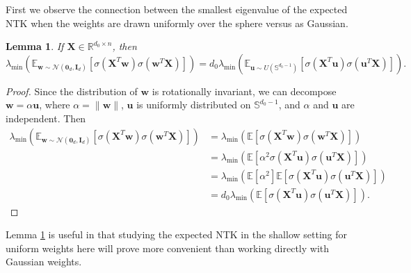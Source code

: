 \documentclass{article}
\newtheorem{lemma}[theorem]{Lemma}
\theoremstyle{definition}
\newcommand*{\R}{\mathbb{R}}
\newcommand{\E}{\mathbb{E}}
\newcommand{\mc}{\mathcal}
\renewcommand{\S}{\mathbb{S}}
\def\vu{{\bm{u}}}
\def\vw{{\bm{w}}}
\def\mI{{\bm{I}}}
\def\mX{{\bm{X}}}
\begin{document}
First we observe the connection between the smallest eigenvalue of the expected NTK when the weights are drawn uniformly over the sphere versus as Gaussian.
\begin{lemma}\label{lem:spherical-gaussian-equivalence}
    If $\mX \in \R^{d_0 \times n}$, then
    \[\lambda_{\min}\left(\E_{\vw \sim \mc{N}(\bm{0}_d, \mI_d) }\left[ \sigma\left( \mX^T \vw \right) \sigma\left(\vw^T \mX\right) \right] \right) = d_0\lambda_{\min}\left(\E_{\vu \sim U(\S^{d_0 - 1}) }\left[\sigma\left( \mX^T \vu \right)\sigma\left(\vu^T \mX\right) \right] \right).\]
\end{lemma}
\begin{proof}
    Since the distribution of $\vw$ is rotationally invariant, we can decompose $\vw = \alpha \vu$, where $\alpha = \|\vw\|$, $\vu$ is uniformly distributed on $\S^{d_0 -1 }$, and $\alpha$ and $\vu$ are independent. Then
    \begin{align*}
        \lambda_{\min}\left(\E_{\vw \sim \mc{N}(\bm{0}_d, \mI_d) }\left[ \sigma\left( \mX^T \vw\right) \sigma\left(\vw^T \mX\right) \right] \right) &= \lambda_{\min}\left(\E\left[ \sigma\left( \mX^T \vw\right) \sigma\left(\vw^T \mX\right) \right] \right)\\
        &= \lambda_{\min}\left(\E\left[\alpha^2 \sigma\left( \mX^T \vu \right) \sigma\left(\vu^T\mX\right) \right] \right)\\
        &= \lambda_{\min}\left(\E\left[\alpha^2\right]\E\left[ \sigma\left( \mX^T \vu\right) \sigma\left(\vu^T\mX\right) \right] \right)\\
        &= d_0 \lambda_{\min}\left(\E\left[ \sigma\left( \mX^T \vu\right) \sigma\left(\vu^T\mX\right) \right]\right). 
    \end{align*}
\end{proof}

Lemma \ref{lem:spherical-gaussian-equivalence} is useful in that studying the expected NTK in the shallow setting for uniform weights here will prove more convenient than working directly with Gaussian weights.
\end{document}
